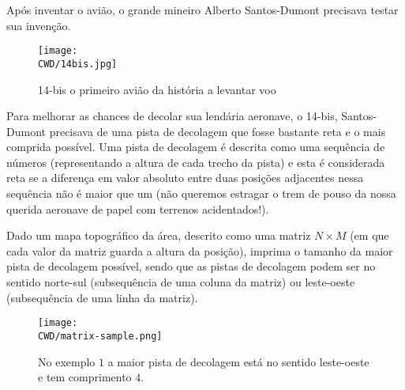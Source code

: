 %

Após inventar o avião, o grande mineiro Alberto Santos-Dumont precisava testar sua invenção.

\begin{figure}[H]
  \centering
  \texttt{[image: \\CWD/14bis.jpg]}
  \caption{14-bis o primeiro avião da história a levantar voo}
\end{figure}

Para melhorar as chances de decolar sua lendária aeronave, o 14-bis, Santos-Dumont precisava de uma pista de decolagem que fosse bastante reta e o mais comprida possível. Uma pista de decolagem é descrita como uma sequência de números (representando a altura de cada trecho da pista) e esta é considerada reta se a diferença em valor absoluto entre duas posições adjacentes nessa sequência não é maior que um (não queremos estragar o trem de pouso da nossa querida aeronave de papel com terrenos acidentados!).

Dado um mapa topográfico da área, descrito como uma matriz $N\times M$ (em que cada valor da matriz guarda a altura da posição), imprima o tamanho da maior pista de decolagem possível, sendo que as pistas de decolagem podem ser no sentido norte-sul (subsequência de uma coluna da matriz) ou leste-oeste (subsequência de uma linha da matriz).

\begin{figure}[H]
  \centering
  \texttt{[image: \\CWD/matrix-sample.png]}
  \caption{No exemplo $1$ a maior pista de decolagem está no sentido leste-oeste e tem comprimento $4$.}
\end{figure}
%
%

%
%



\sampleio
